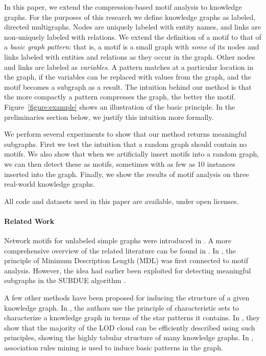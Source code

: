 \documentclass[letterpaper]{article} %
\begin{document}
In this paper, we extend the compression-based motif analysis to knowledge graphs. For the purposes of this research we define knowledge graphs as labeled, directed multigraphs. Nodes are uniquely labeled with entity names, and links are non-uniquely labeled with relations.  We extend the definition of a motif to that of a \emph{basic graph pattern}: that is, a motif is a small graph with \emph{some} of its nodes and links labeled with entities and relations as they occur in the graph. Other nodes and links are labeled as \emph{variables}. A pattern matches at a particular location in the graph, if the variables can be replaced with values from the graph, and the motif becomes a subgraph as a result. 
The intuition behind our method is that the more compactly a pattern compresses the graph, the better the motif. Figure~\ref{figure:example} shows an illustration of the basic principle. In the preliminaries section below, we justify this intuition more formally.

We perform several experiments to show that our method returns meaningful subgraphs. First we test the intuition that a random graph should contain no motifs. We also show that when we artificially insert motifs into a random graph, we can then detect these as motifs, sometimes with as few as 10 instances inserted into the graph. Finally, we show the results of motif analysis on three real-world knowledge graphs.

All code and datasets used in this paper are available, under open licenses.\footnotemark


\paragraph{Related Work}

Network motifs for unlabeled simple graphs were introduced in \cite{milo2002network}. A more comprehensive overview of the related literature can be found in \cite[Section~1.1]{bloem2017large}. In \cite{bloem2017large}, the principle of Minimum Description Length (MDL) was first connected to motif analysis. However, the idea had earlier been exploited for detecting meaningful subgraphs in the SUBDUE algorithm \cite{cook1994substructure}.

A few other methods have been proposed for inducing the structure of a given knowledge graph. In \cite{pham2015deriving}, the authors use the principle of characteristic sets to characterize a knowledge graph in terms of the star patterns it contains. In \cite{pham2016exploiting}, they show that the majority of the LOD cloud can be efficiently described using such principles, showing the highly tabular structure of many knowledge graphs. In \cite{volker2011statistical}, association rules mining is used to induce basic patterns in the graph. 
\end{document}

